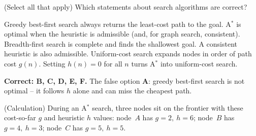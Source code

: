 \documentclass[answers,addpoints]{exam}
\begin{document}
\begin{questions}
\question[3] (Select all that apply) Which statements about search algorithms are
correct?
\begin{checkboxes}
  \choice Greedy best-first search always returns the least-cost path to the goal.
  \CorrectChoice A$^{*}$ is optimal when the heuristic is admissible (and, for
        graph search, consistent).
  \CorrectChoice Breadth-first search is complete and finds the shallowest goal.
  \CorrectChoice A consistent heuristic is also admissible.
  \CorrectChoice Uniform-cost search expands nodes in order of path cost $g(n)$.
  \CorrectChoice Setting $h(n)=0$ for all $n$ turns A$^{*}$ into uniform-cost search.
\end{checkboxes}
\begin{solution}
\textbf{Correct: B, C, D, E, F.} The false option \textbf{A}: greedy best-first
search is not optimal -- it follows $h$ alone and can miss the cheapest path.
\end{solution}

\question[5] (Calculation) During an A$^{*}$ search, three nodes sit on the
frontier with these cost-so-far $g$ and heuristic $h$ values:
node~$A$ has $g=2,\ h=6$; node~$B$ has $g=4,\ h=3$; node~$C$ has $g=5,\ h=5$.


\end{questions}
\end{document}
